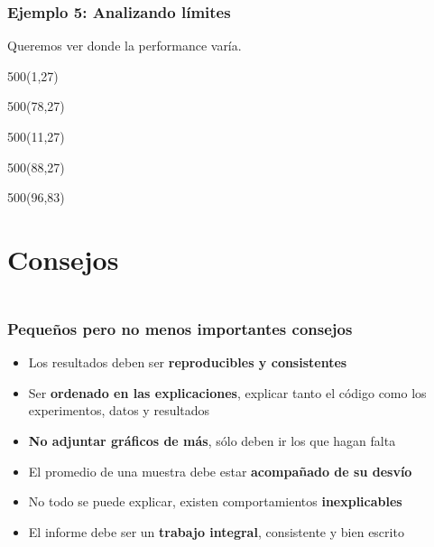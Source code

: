 \documentclass[aspectratio=169]{beamer}
\begin{document}
\begin{frame}[fragile,t]
    \frametitle{ \vspace{-1cm} \flushright \colorbox{verdeuca}{ \small \textcolor{white}{ \footnotesize \secname } }\\
    Ejemplo 5: Analizando límites}
    \vskip 5pt
    Queremos ver donde la performance varía.
    \begin{textblock}{500}(1,27)   \end{textblock}
    \begin{textblock}{500}(78,27)  \end{textblock}
    \begin{textblock}{500}(11,27)    \end{textblock}
    \begin{textblock}{500}(88,27)  \end{textblock}
    \begin{textblock}{500}(96,83)  \end{textblock}
\end{frame}

\section{Consejos}

\begin{frame}[fragile]
    \frametitle{ \vspace{-1cm} \flushright \colorbox{verdeuca}{ \small \textcolor{white}{ \footnotesize \secname } }\\
    Pequeños pero no menos importantes consejos}
    \small
    \begin{itemize}
     \item Los resultados deben ser \textbf{reproducibles y consistentes}
     \vskip 15pt \pause
     \item Ser \textbf{ordenado en las explicaciones}, explicar tanto el código como los experimentos, datos y resultados
     \vskip 15pt \pause
     \item \textbf{No adjuntar gráficos de más}, sólo deben ir los que hagan falta
     \vskip 15pt \pause
     \item El promedio de una muestra debe estar \textbf{acompañado de su desvío}
     \vskip 15pt \pause
     \item No todo se puede explicar, existen comportamientos \textbf{inexplicables}
     \vskip 15pt \pause
     \item El informe debe ser un \textbf{trabajo integral}, consistente y bien escrito
    \end{itemize}
\end{frame}
\end{document}
